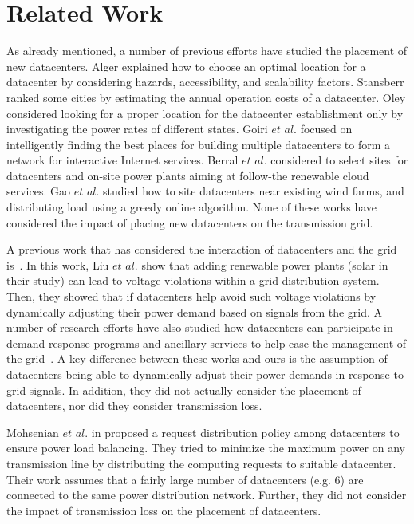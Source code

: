 \section{Related Work}
\label{sec:related}

As already mentioned, a number of previous efforts have studied the placement of new datacenters.  Alger \cite{Dalger05} explained how to choose an optimal location for a datacenter by considering hazards, accessibility, and scalability factors.  Stansberr \cite{Stansberr06} ranked some cities by estimating the annual operation costs of a datacenter.  Oley \cite{Boley09} considered looking for a proper location for the datacenter establishment only by investigating the power rates of different states.  Goiri $\textit{et al.}$ \cite{Goiri11place} focused on intelligently finding the best places for building multiple datacenters to form a network for interactive Internet services.  Berral $\textit{et al.}$ \cite{berral2014building} considered to select sites for datacenters and on-site power plants aiming at follow-the renewable cloud services.  Gao $\textit{et al.}$ \cite{gao2013answer} studied how to site datacenters near existing wind farms, and distributing load using a greedy online algorithm.  None of these works have considered the impact of placing new datacenters on the transmission grid.

A previous work that has considered the interaction of datacenters and the grid is~\cite{liu2014pricing}.  In this work, Liu $\textit{et al.}$ show that adding renewable power plants (solar in their study) can lead to voltage violations within a grid distribution system.  Then, they showed that if datacenters help avoid such voltage violations by dynamically adjusting their power demand based on signals from the grid.  A number of research efforts have also studied how datacenters can participate in demand response programs and ancillary services to help ease the management of the grid~\cite{Aikema12,AdamWierman2014}.  A key difference between these works and ours is the assumption of datacenters being able to dynamically adjust their power demands in response to grid signals.  In addition, they did not actually consider the placement of datacenters, nor did they consider transmission loss.

Mohsenian $\textit{et al.}$ in \cite{Mohsenian-Rad10grid} proposed a request distribution policy among datacenters to ensure power load balancing. They tried to minimize the maximum power on any transmission line by distributing the computing requests to suitable datacenter. Their work assumes that a fairly large number of datacenters (e.g. 6) are connected to the same power distribution network.  Further, they did not consider the impact of transmission loss on the placement of datacenters.

